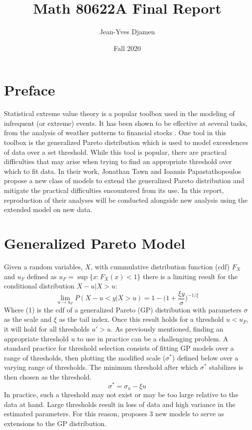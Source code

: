 \documentclass[12pt]{article}
\title{Math 80622A Final Report}
\author{Jean-Yves Djamen }
\date{Fall 2020}
\theoremstyle{definition}
\theoremstyle{definition}
\begin{document}
\maketitle
\tableofcontents{}
\doublespacing

\pagebreak


\section{Preface}
Statistical extreme value theory is a popular toolbox used in the modeling of infrequent (or extreme) events. It has been shown to be effective at several tasks, from the analysis of weather patterns \cite{test1} to financial stocks \cite{test2}. One tool in this toolbox is the generalized Pareto distribution which is used to model exceedences of data over a set threshold. While this tool is popular, there are practical difficulties that may arise when trying to find an appropriate threshold over which to fit data. In their work, \cite{papatawn} Jonathan Tawn and Ioannis Papastathopoulos propose a new class of models to extend the generalized Pareto distribution and mitigate the practical difficulties encountered from its use. In this report, reproduction of their analyses will be conducted alongside new analysis using the extended model on new data. 

\section{Generalized Pareto Model}
Given a random variables, $X$, with cummulative distribution function (cdf) $F_X$ and $u_F$ defined as $u_F= \sup\{x: F_X(x)<1\}$ there is  a limiting result \cite{gpd} for the conditional distribution $X-u|X>u$: 
\[ \lim_{u\rightarrow u_F }P(X-u < y|X>u) = 1-\bigg( 1+ \frac{\xi y}{\sigma}\bigg)^{-1/\xi} \tag{1}\]
Where (1) is the cdf of a generalized Pareto (GP) distribution with parameters $\sigma$ as the scale and $\xi$ as the tail index. Once this result holds for a threshold $u<u_F$, it will hold for all thresholds $u'>u$. As previously mentioned, finding an appropriate threshold $u$ to use in practice can be a challenging problem. A standard practice for threshold selection consists of fitting GP models over a range of thresholds, then plotting the modified scale ($\sigma^*$) defined below over a varying range of thresholds. The minimum threshold after which $\sigma^*$ stabilizes is then chosen as the threshold.
\[\sigma^*= \sigma_u-\xi u\]
In practice, such a threshold may not exist or may be too large relative to the data at hand. Large thresholds result in loss of data and high variance in the estimated parameters. For this reason, \cite{papatawn} proposes 3 new models to serve as extensions to the GP distribution. 
\end{document}
